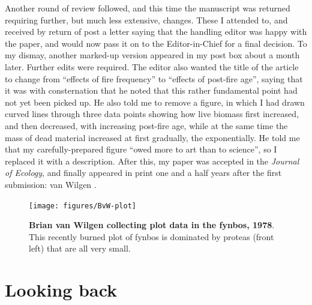 \documentclass[
]{krantz}
\begin{document}
Another round of review followed, and this time the manuscript was returned requiring further, but much less extensive, changes. These I attended to, and received by return of post a letter saying that the handling editor was happy with the paper, and would now pass it on to the Editor-in-Chief for a final decision. To my dismay, another marked-up version appeared in my post box about a month later. Further edits were required. The editor also wanted the title of the article to change from ``effects of fire frequency'' to ``effects of post-fire age'', saying that it was with consternation that he noted that this rather fundamental point had not yet been picked up. He also told me to remove a figure, in which I had drawn curved lines through three data points showing how live biomass first increased, and then decreased, with increasing post-fire age, while at the same time the mass of dead material increased at first gradually, the exponentially. He told me that my carefully-prepared figure ``owed more to art than to science'', so I replaced it with a description. After this, my paper was accepted in the \emph{Journal of Ecology}, and finally appeared in print one and a half years after the first submission: van Wilgen \citep{vanwilgen1982effects}.



\begin{figure}
\texttt{[image: figures/BvW-plot]} \caption{\textbf{Brian van Wilgen collecting plot data in the fynbos, 1978}. This recently burned plot of fynbos is dominated by proteas (front left) that are all very small.}\label{fig:BvW-plot}
\end{figure}

\hypertarget{looking-back-1}{%
\section{Looking back}\label{looking-back-1}}
\end{document}
